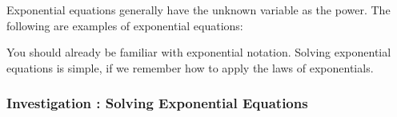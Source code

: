       
\label{m39253*id154446}Exponential equations generally have the unknown variable as the power. The
following are examples of exponential equations:\par 
      \label{m39253*id154451}\nopagebreak\noindent{}
    
      
      \label{m39253*id154556}You should already be familiar with exponential notation. Solving exponential
equations is simple, if we remember how to apply the laws of exponentials.\par 
\label{m39253*secfhsst!!!underscore!!!id3051}
            \subsubsection{  Investigation : Solving Exponential Equations }
            \nopagebreak
            
